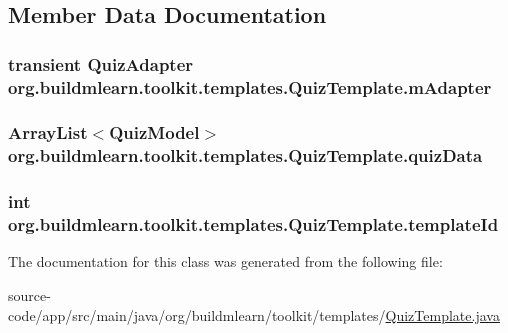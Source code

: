 \subsection{Member Data Documentation}
\subsubsection[{\texorpdfstring{m\+Adapter}{mAdapter}}]{\setlength{\rightskip}{0pt plus 5cm}transient Quiz\+Adapter org.\+buildmlearn.\+toolkit.\+templates.\+Quiz\+Template.\+m\+Adapter\hspace{0.3cm}{\ttfamily [private]}}\hypertarget{classorg_1_1buildmlearn_1_1toolkit_1_1templates_1_1QuizTemplate_ad6eb1e75e6feb5e1af118ef0781a6a13}{}\label{classorg_1_1buildmlearn_1_1toolkit_1_1templates_1_1QuizTemplate_ad6eb1e75e6feb5e1af118ef0781a6a13}
\subsubsection[{\texorpdfstring{quiz\+Data}{quizData}}]{\setlength{\rightskip}{0pt plus 5cm}Array\+List$<${\bf Quiz\+Model}$>$ org.\+buildmlearn.\+toolkit.\+templates.\+Quiz\+Template.\+quiz\+Data\hspace{0.3cm}{\ttfamily [private]}}\hypertarget{classorg_1_1buildmlearn_1_1toolkit_1_1templates_1_1QuizTemplate_adb05fdc78ce8f4f5198dec8c1e3c5504}{}\label{classorg_1_1buildmlearn_1_1toolkit_1_1templates_1_1QuizTemplate_adb05fdc78ce8f4f5198dec8c1e3c5504}
\subsubsection[{\texorpdfstring{template\+Id}{templateId}}]{\setlength{\rightskip}{0pt plus 5cm}int org.\+buildmlearn.\+toolkit.\+templates.\+Quiz\+Template.\+template\+Id\hspace{0.3cm}{\ttfamily [private]}}\hypertarget{classorg_1_1buildmlearn_1_1toolkit_1_1templates_1_1QuizTemplate_a3aa259fc687f8ba50518707c422a9611}{}\label{classorg_1_1buildmlearn_1_1toolkit_1_1templates_1_1QuizTemplate_a3aa259fc687f8ba50518707c422a9611}


The documentation for this class was generated from the following file\+:\begin{DoxyCompactItemize}
\item 
source-\/code/app/src/main/java/org/buildmlearn/toolkit/templates/\hyperlink{QuizTemplate_8java}{Quiz\+Template.\+java}\end{DoxyCompactItemize}
